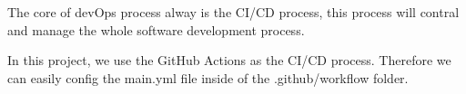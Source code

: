 The core of devOps process alway is the CI/CD process, this process will contral
and manage the whole software development process.

In this project, we use the GitHub Actions as the CI/CD process.
Therefore we can easily config the main.yml file inside of the .github/workflow folder.

\begin{lstlisting}

\end{lstlisting}
